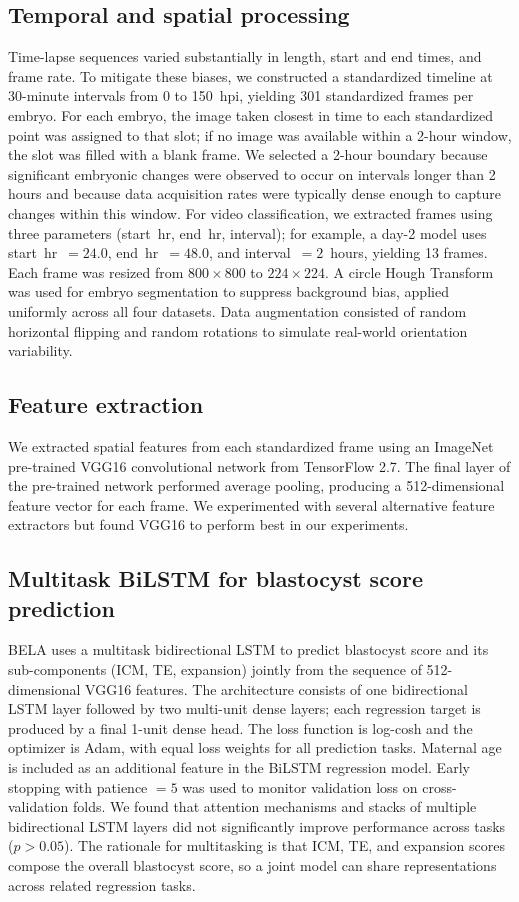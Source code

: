 \documentclass[10pt]{article}
\begin{document}
\subsection{Temporal and spatial processing}
Time-lapse sequences varied substantially in length, start and end times, and
frame rate. To mitigate these biases, we constructed a standardized timeline
at 30-minute intervals from 0 to 150~hpi, yielding 301 standardized frames per
embryo. For each embryo, the image taken closest in time to each standardized
point was assigned to that slot; if no image was available within a 2-hour
window, the slot was filled with a blank frame. We selected a 2-hour boundary
because significant embryonic changes were observed to occur on intervals
longer than 2 hours and because data acquisition rates were typically dense
enough to capture changes within this window. For video classification, we
extracted frames using three parameters (start~hr, end~hr, interval); for
example, a day-2 model uses start~hr~$=24.0$, end~hr~$=48.0$, and
interval~$=2$~hours, yielding 13 frames. Each frame was resized from
$800 \times 800$ to $224 \times 224$. A circle Hough Transform was used for
embryo segmentation to suppress background bias, applied uniformly across all
four datasets. Data augmentation consisted of random horizontal flipping and
random rotations to simulate real-world orientation variability.

\subsection{Feature extraction}
We extracted spatial features from each standardized frame using an ImageNet
pre-trained VGG16 convolutional network from TensorFlow 2.7. The final layer
of the pre-trained network performed average pooling, producing a
512-dimensional feature vector for each frame. We experimented with several
alternative feature extractors but found VGG16 to perform best in our
experiments.

\subsection{Multitask BiLSTM for blastocyst score prediction}
BELA uses a multitask bidirectional LSTM to predict blastocyst score and its
sub-components (ICM, TE, expansion) jointly from the sequence of 512-dimensional
VGG16 features. The architecture consists of one bidirectional LSTM layer
followed by two multi-unit dense layers; each regression target is produced by
a final 1-unit dense head. The loss function is log-cosh and the optimizer is
Adam, with equal loss weights for all prediction tasks. Maternal age is
included as an additional feature in the BiLSTM regression model. Early
stopping with patience $=5$ was used to monitor validation loss on
cross-validation folds. We found that attention mechanisms and stacks of
multiple bidirectional LSTM layers did not significantly improve performance
across tasks ($p > 0.05$). The rationale for multitasking is that ICM, TE, and
expansion scores compose the overall blastocyst score, so a joint model can
share representations across related regression tasks.
\end{document}

